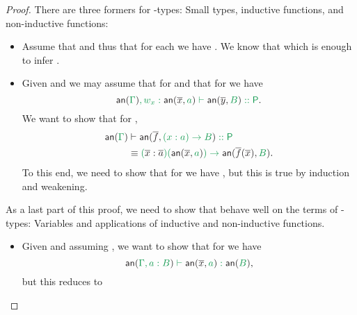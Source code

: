 \begin{proof}
There are three formers for \grm{\Pc}-types: Small types, inductive functions, and
non-inductive functions:
\begin{itemize}
\item Assume that  and thus that for each
 we have
.
We know that 
which is enough to infer .
\item Given  and 
we may assume that  for 
and that for  we have
\begin{equation*}
\grm{\annotate{\Gamma}, w_x : \anntwo{\overline{x}}{a} \vdash \anntwo{\overline{y}}{B} :: \Pc} \text{.}
\end{equation*}
We want to show that for ,
\begin{align*}
\grm{\annotate{\Gamma}} &\vdash \grm{\anntwo{\overline{f}}{(x : a) \to B} :: \Pc} \\
&\equiv \grm{(\blm{\overline{x} : \overline{a}})(\anntwo{\overline{x}}{a}) \to \anntwo{\overline{f}(\overline{x})}{B}} \text{.}
\end{align*}
To this end, we need to show that for  we have
,
but this is true by induction and weakening.
\end{itemize}
As a last part of this proof, we need to show that \grm{\annotate{}} behave well
on the terms of \grm{\Sc}-types: Variables and applications of inductive and
non-inductive functions.
\begin{itemize}
\item Given  and assuming ,
we want to show that for  we have
\begin{equation*}
\grm{\annotate{\Gamma, a : B} \vdash \anntwo{\overline{x}}{a} : \annotate{B}} \text{,}
\end{equation*}
but this reduces to
\begin{equation*}

\end{equation*}
\end{itemize}
\end{proof}
